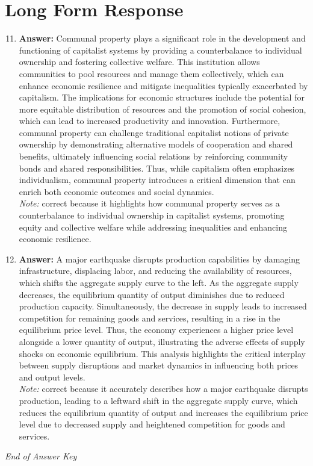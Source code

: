 \documentclass[12pt]{article}
\begin{document}
\section*{Long Form Response}
\begin{enumerate}[label=\arabic*.]
\setcounter{enumi}{10}
\item \textbf{Answer:} Communal property plays a significant role in the development and functioning of capitalist systems by providing a counterbalance to individual ownership and fostering collective welfare. This institution allows communities to pool resources and manage them collectively, which can enhance economic resilience and mitigate inequalities typically exacerbated by capitalism. The implications for economic structures include the potential for more equitable distribution of resources and the promotion of social cohesion, which can lead to increased productivity and innovation. Furthermore, communal property can challenge traditional capitalist notions of private ownership by demonstrating alternative models of cooperation and shared benefits, ultimately influencing social relations by reinforcing community bonds and shared responsibilities. Thus, while capitalism often emphasizes individualism, communal property introduces a critical dimension that can enrich both economic outcomes and social dynamics.
\\ \textit{Note:} correct because it highlights how communal property serves as a counterbalance to individual ownership in capitalist systems, promoting equity and collective welfare while addressing inequalities and enhancing economic resilience.
\item \textbf{Answer:} A major earthquake disrupts production capabilities by damaging infrastructure, displacing labor, and reducing the availability of resources, which shifts the aggregate supply curve to the left. As the aggregate supply decreases, the equilibrium quantity of output diminishes due to reduced production capacity. Simultaneously, the decrease in supply leads to increased competition for remaining goods and services, resulting in a rise in the equilibrium price level. Thus, the economy experiences a higher price level alongside a lower quantity of output, illustrating the adverse effects of supply shocks on economic equilibrium. This analysis highlights the critical interplay between supply disruptions and market dynamics in influencing both prices and output levels.
\\ \textit{Note:} correct because it accurately describes how a major earthquake disrupts production, leading to a leftward shift in the aggregate supply curve, which reduces the equilibrium quantity of output and increases the equilibrium price level due to decreased supply and heightened competition for goods and services.
\end{enumerate}

\vfill
\noindent\textit{End of Answer Key}
\end{document}
